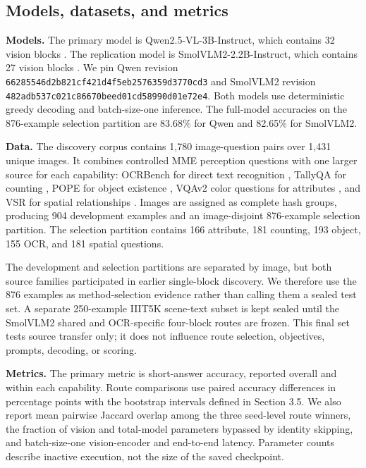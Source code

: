\documentclass[10pt]{article}
\begin{document}
\subsection{Models, datasets, and metrics}\label{models-datasets-and-metrics}

\textbf{Models.} The primary model is Qwen2.5-VL-3B-Instruct, which
contains 32 vision blocks \citep{bai2025qwen25vl}. The replication model
is SmolVLM2-2.2B-Instruct, which contains 27 vision blocks
\citep{huggingface2025smolvlm2}. We pin Qwen revision
\nolinkurl{66285546d2b821cf421d4f5eb2576359d3770cd3} and SmolVLM2 revision
\nolinkurl{482adb537c021c86670beed01cd58990d01e72e4}. Both models use
deterministic greedy decoding and batch-size-one inference. The
full-model accuracies on the 876-example selection partition are 83.68\%
for Qwen and 82.65\% for SmolVLM2.

\textbf{Data.} The discovery corpus contains 1,780 image-question pairs
over 1,431 unique images. It combines controlled MME perception
questions \citep{fu2023mme} with one larger source for each capability:
OCRBench for direct text recognition \citep{liu2023ocrbench}, TallyQA
for counting \citep{acharya2019tallyqa}, POPE for object existence
\citep{li2023pope}, VQAv2 color questions for attributes
\citep{goyal2017vqav2}, and VSR for spatial relationships
\citep{liu2023vsr}. Images are assigned as complete hash groups,
producing 904 development examples and an image-disjoint 876-example
selection partition. The selection partition contains 166 attribute, 181
counting, 193 object, 155 OCR, and 181 spatial questions.

The development and selection partitions are separated by image, but
both source families participated in earlier single-block discovery. We
therefore use the 876 examples as method-selection evidence rather than
calling them a sealed test set. A separate 250-example IIIT5K scene-text
subset \citep{mishra2012iiit5k} is kept sealed until the SmolVLM2 shared
and OCR-specific four-block routes are frozen. This final set tests
source transfer only; it does not influence route selection, objectives,
prompts, decoding, or scoring.

\textbf{Metrics.} The primary metric is short-answer accuracy, reported
overall and within each capability. Route comparisons use paired
accuracy differences in percentage points with the bootstrap intervals
defined in Section 3.5. We also report mean pairwise Jaccard overlap
among the three seed-level route winners, the fraction of vision and
total-model parameters bypassed by identity skipping, and batch-size-one
vision-encoder and end-to-end latency. Parameter counts describe
inactive execution, not the size of the saved checkpoint.
\end{document}
